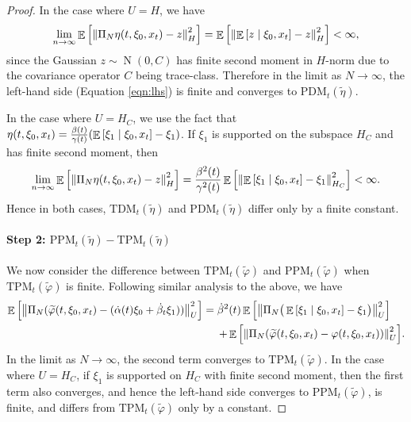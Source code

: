 \begin{proof}
  In the case where \(U = H\), we have
  \[
    \lim\limits_{n \to \infty} \mathop{\mathbb{E}}\qty[\norm{\Pi_{N} \eta(t, \xi_{0}, x_{t}) - z}^{2}_{H}] = \mathop{\mathbb{E}}\qty[\norm{\mathop{\mathbb{E}}\qty[z \mid \xi_{0}, x_{t}] - z}_{H}^{2}] < \infty,
  \]
  since the Gaussian \(z \sim \operatorname{N}(0, C)\) has finite second moment in \(H\)-norm due to the covariance operator \(C\) being trace-class. Therefore in the limit as \(N \to \infty\), the left-hand side (Equation \ref{eqn:lhs}) is finite and converges to \(\mathrm{PDM}_{t}(\widetilde{\eta})\).

  In the case where \(U = H_{C}\), we use the fact that \(\eta(t,\xi_{0}, x_{t}) = \frac{\beta(t)}{\gamma(t)}\qty(\mathop{\mathbb{E}}\qty[\xi_{1} \mid \xi_{0}, x_{t}] - \xi_{1})\). If \(\xi_{1}\) is supported on the subspace \(H_{C}\) and has finite second moment, then
  \[
    \lim\limits_{n \to \infty} \mathop{\mathbb{E}}\qty[\norm{\Pi_{N} \eta(t, \xi_{0}, x_{t}) - z}^{2}_{H}]  = \frac{\beta^{2}(t)}{\gamma^{2}(t)} \mathop{\mathbb{E}}\qty[\norm{\mathop{\mathbb{E}}\qty[\xi_{1} \mid \xi_{0}, x_{t}] - \xi_{1}}_{H_{C}}^{2}] < \infty.
  \]
  Hence in both cases,  \(\mathrm{TDM}_{t}(\widetilde{\eta})\) and \(\mathrm{PDM}_{t}(\widetilde{\eta})\) differ only by a finite constant.

  \paragraph{Step 2: \(\mathrm{PPM}_{t}(\widetilde{\eta}) - \mathrm{TPM}_{t}(\widetilde{\eta})\)}

  We now consider the difference between \(\mathrm{TPM}_{t}(\widetilde{\varphi})\) and \(\mathrm{PPM}_{t}(\widetilde{\varphi})\) when \(\mathrm{TPM}_{t}(\widetilde{\varphi})\) is finite. Following similar analysis to the above, we have
  \begin{align*}
    \mathop{\mathbb{E}}\qty[\norm{\Pi_{N}( \widetilde{\varphi}(t, \xi_{0}, x_{t}) - (\dot{\alpha}(t) \xi_{0} + \dot{\beta}_{t} \xi_{1}) )}^{2}_{U}] &= \dot{\beta}^{2}(t)\mathop{\mathbb{E}}\qty[\norm{\Pi_{N} \big(\mathop{\mathbb{E}}\qty[\xi_{1} \mid \xi_{0}, x_{t}] - \xi_{1}\big)}_{U}^{2}] \\
    &\mathrel{\phantom{=}}\, + \mathop{\mathbb{E}}\qty[\norm{\Pi_{N}(\widetilde{\varphi}(t, \xi_{0}, x_{t}) - \varphi(t, \xi_{0}, x_{t}))}^{2}_{U}].
  \end{align*}
  In the limit as \(N \to \infty\), the second term converges to \(\mathrm{TPM}_{t}(\widetilde{\varphi})\). In the case where \(U = H_{C}\), if \(\xi_{1}\) is supported on \(H_{C}\) with finite second moment, then the first term also converges, and hence the left-hand side converges to \(\mathrm{PPM}_{t}(\widetilde{\varphi})\), is finite, and differs from \(\mathrm{TPM}_{t}(\widetilde{\varphi})\) only by a constant.


\end{proof}
